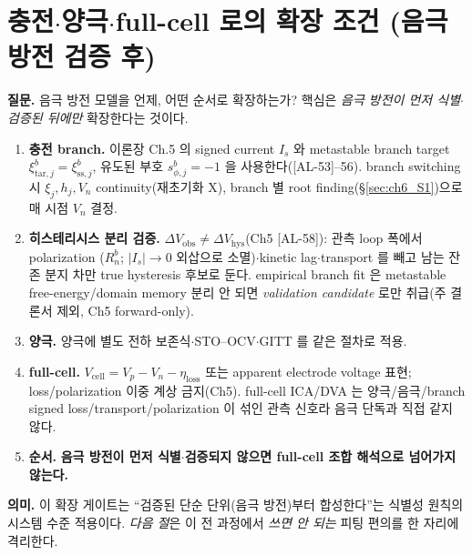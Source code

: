 \documentclass[11pt,a4paper]{article}
\newcommand{\cell}{\mathrm{cell}}
\newcommand{\sstat}{\mathrm{ss}}
\newcommand{\hys}{\mathrm{hys}}
\newcommand{\tar}{\mathrm{tar}}
\newcommand{\loss}{\mathrm{loss}}
\newcommand{\obs}{\mathrm{obs}}
\newcommand{\AL}[1]{\textsf{[AL-#1]}}
\begin{document}
\section{충전$\cdot$양극$\cdot$full-cell 로의 확장 조건 (음극 방전 검증 후)}\label{sec:ch6_extension}
\textbf{질문.} 음극 방전 모델을 언제, 어떤 순서로 확장하는가? 핵심은 \emph{음극 방전이 먼저 식별$\cdot$검증된
뒤에만} 확장한다는 것이다.
\begin{enumerate}[label=E\arabic*),leftmargin=2.4em]
\item \textbf{충전 branch.} 이론장 Ch.5 의 signed current $I_s$ 와 metastable branch target
  $\xi_{\tar,j}^b=\xi_{\sstat,j}^b$, 유도된 부호 $s_{\phi,j}^b=-1$ 을 사용한다(\AL{53}--56). branch switching 시
  $\xi_j,h_j,V_n$ continuity(재초기화 X), branch 별 root finding(\S\ref{sec:ch6_S1})으로 매 시점 $V_n$ 결정.
\item \textbf{히스테리시스 분리 검증.} $\Delta V_\obs\ne\Delta V_\hys$(Ch5 \AL{58}): 관측 loop 폭에서 polarization
  ($R_n^b$; $|I_s|\to0$ 외삽으로 소멸)$\cdot$kinetic lag$\cdot$transport 를 빼고 남는 잔존 분지 차만 true
  hysteresis 후보로 둔다. empirical branch fit 은 metastable free-energy/domain memory 분리 안 되면 \emph{validation
  candidate} 로만 취급(주 결론서 제외, Ch5 forward-only).
\item \textbf{양극.} 양극에 별도 전하 보존식$\cdot$STO--OCV$\cdot$GITT 를 같은 절차로 적용.
\item \textbf{full-cell.} $V_\cell=V_p-V_n-\eta_\loss$ 또는 apparent electrode voltage 표현; loss/polarization
  이중 계상 금지(Ch5). full-cell ICA/DVA 는 양극/음극/branch signed loss/transport/polarization 이 섞인 관측
  신호라 음극 단독과 직접 같지 않다.
\item \textbf{순서.} \textbf{음극 방전이 먼저 식별$\cdot$검증되지 않으면 full-cell 조합 해석으로 넘어가지 않는다.}
\end{enumerate}
\textbf{의미.} 이 확장 게이트는 ``검증된 단순 단위(음극 방전)부터 합성한다''는 식별성 원칙의 시스템 수준 적용이다.
\emph{다음 절}은 이 전 과정에서 \emph{쓰면 안 되는} 피팅 편의를 한 자리에 격리한다.

\end{document}
